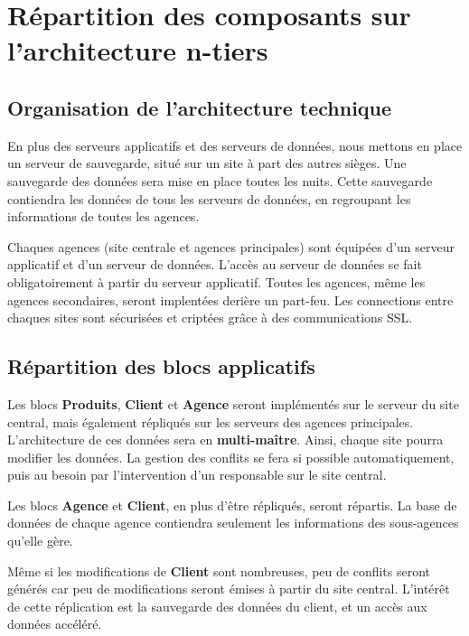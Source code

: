 
\section{Répartition des composants sur l'architecture n-tiers}

\subsection{Organisation de l'architecture technique}

En plus des serveurs applicatifs et des serveurs de données, nous mettons en place un serveur de sauvegarde, situé sur un site à part des autres sièges. Une sauvegarde des données sera mise en place toutes les nuits. Cette sauvegarde contiendra les données de tous les serveurs de données, en regroupant les informations de toutes les agences.

Chaques agences (site centrale et agences principales) sont équipées d'un serveur applicatif et d'un serveur de données. L'accès au serveur de données se fait obligatoirement à partir du serveur applicatif. Toutes les agences, même les agences secondaires, seront implentées derière un part-feu. Les connections entre chaques sites sont sécurisées et criptées grâce à des communications SSL. 
  
\subsection{Répartition des blocs applicatifs}

Les blocs \textbf{Produits}, \textbf{Client} et \textbf{Agence} seront implémentés sur le serveur du site central, mais également répliqués sur les serveurs des agences principales. L'architecture de ces données sera en \textbf{multi-maître}. Ainsi, chaque site pourra modifier les données. La gestion des conflits se fera si possible automatiquement, puis au besoin par l'intervention d'un responsable sur le site central.

Les blocs \textbf{Agence} et \textbf{Client}, en plus d'être répliqués, seront répartis. La base de données de chaque agence contiendra seulement les informations des sous-agences qu'elle gère.

Même si les modifications de \textbf{Client} sont nombreuses, peu de conflits seront générés car peu de modifications seront émises à partir du site central. L'intérêt de cette réplication est la sauvegarde des données du client, et un accès aux données accéléré.

